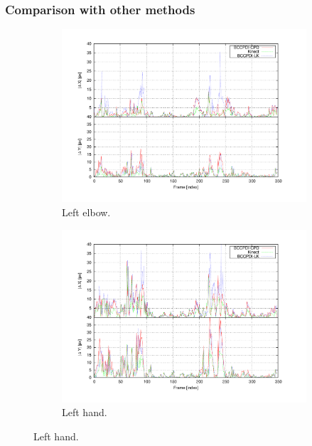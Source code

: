 \subsubsection{Comparison with other methods}\label{ch:chapter02_02_03}

\begin{figure}[t]
        \centering

        \begin{subfigure}[b]{0.5\columnwidth}
                \centering
                \includegraphics[width=\textwidth, trim=50 40 80 40,clip]{fig27.pdf}
                \caption{Left elbow.}
                \label{fig:cp02_comparison_left_elbow}
        \end{subfigure}%
        \begin{subfigure}[b]{0.5\columnwidth}
                \centering
		  \includegraphics[width=\textwidth, trim=50 40 80 40,clip]{fig28.pdf}
                \caption{Left hand.}
                \label{fig:cp02_comparison_left_hand}
        \end{subfigure}%


\end{figure}
